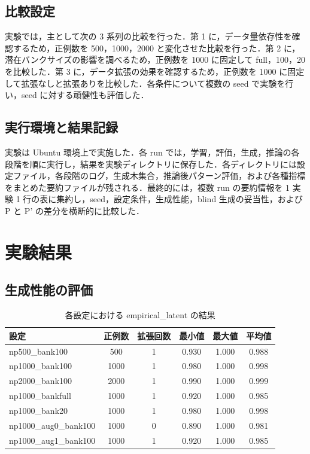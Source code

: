 \documentclass[submit,techrep,noauthor]{ipsj}
\begin{document}
\subsection{比較設定}

実験では，主として次の 3 系列の比較を行った．第 1 に，データ量依存性を確認するため，正例数を 500，1000，2000 と変化させた比較を行った．第 2 に，潜在バンクサイズの影響を調べるため，正例数を 1000 に固定して full，100，20 を比較した．第 3 に，データ拡張の効果を確認するため，正例数を 1000 に固定して拡張なしと拡張ありを比較した．各条件について複数の seed で実験を行い，seed に対する頑健性も評価した．

\subsection{実行環境と結果記録}

実験は Ubuntu 環境上で実施した．各 run では，学習，評価，生成，推論の各段階を順に実行し，結果を実験ディレクトリに保存した．各ディレクトリには設定ファイル，各段階のログ，生成木集合，推論後パターン評価，および各種指標をまとめた要約ファイルが残される．最終的には，複数 run の要約情報を 1 実験 1 行の表に集約し，seed，設定条件，生成性能，blind 生成の妥当性，および P と P' の差分を横断的に比較した．

\section{実験結果}

\subsection{生成性能の評価}

\begin{table}[t]
\centering
\small
\caption{各設定における empirical\_latent の結果}
\label{tab:empirical-latent}
\begin{tabular}{lccccc}
\toprule
設定 & 正例数 & 拡張回数 & 最小値 & 最大値 & 平均値 \\
\midrule
np500\_bank100       & 500  & 1 & 0.930 & 1.000 & 0.988 \\
np1000\_bank100      & 1000 & 1 & 0.980 & 1.000 & 0.998 \\
np2000\_bank100      & 2000 & 1 & 0.990 & 1.000 & 0.999 \\
np1000\_bankfull     & 1000 & 1 & 0.920 & 1.000 & 0.985 \\
np1000\_bank20       & 1000 & 1 & 0.980 & 1.000 & 0.998 \\
np1000\_aug0\_bank100 & 1000 & 0 & 0.890 & 1.000 & 0.981 \\
np1000\_aug1\_bank100 & 1000 & 1 & 0.920 & 1.000 & 0.985 \\
\bottomrule
\end{tabular}
\end{table}
\end{document}
